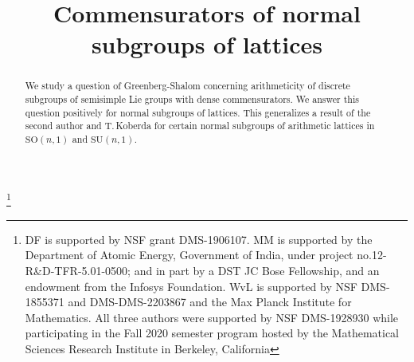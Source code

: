 \documentclass[JEP,XML,SOM,Unicode,published]{cedram}
\theoremstyle{definition}
\begin{document}
\frontmatter

\title{Commensurators of normal subgroups of lattices}

\author[\initial{D.} \lastname{Fisher}]{ }
\address{Department of Mathematics, Rice University,\\
6100 Main St MS 136, Houston, TX 77005, USA}

\author[\initial{M.} \lastname{Mj}]{ }
\address{School of Mathematics, Tata Institute of Fundamental Research,\\
Homi Bhabha Road, Navy Nagar, Colaba, Mumbai, Maharashtra 400005, India}

\author[\initial{W.} \lastname{van Limbeek}]{ }
\address{Department of Mathematics, Statistics, and Computer Science, University of Illinois at Chicago,\\
851 S. Morgan Street, Chicago, IL 60607-7045, USA}

\thanks{DF is supported by NSF grant DMS-1906107. MM is supported by the Department of Atomic Energy, Government of India, under project no.12-R\&D-TFR-5.01-0500; and in part by a DST JC Bose Fellowship, and an endowment from the Infosys Foundation. WvL is supported by NSF DMS-1855371 and DMS-DMS-2203867 and the Max Planck Institute for Mathematics. All three authors were supported by NSF DMS-1928930 while participating in the Fall 2020 semester program hosted by the Mathematical Sciences Research Institute in Berkeley, California}

\begin{abstract}
We study a question of Greenberg-Shalom concerning arithmeticity of discrete subgroups of semisimple Lie groups with dense commensurators. We answer this question positively for normal subgroups of lattices. This generalizes a result of the second author and T.\,Koberda for certain normal subgroups of arithmetic lattices in $\mathrm{SO}(n,1)$ and $\mathrm{SU}(n,1)$.
\end{abstract}



\end{document}
